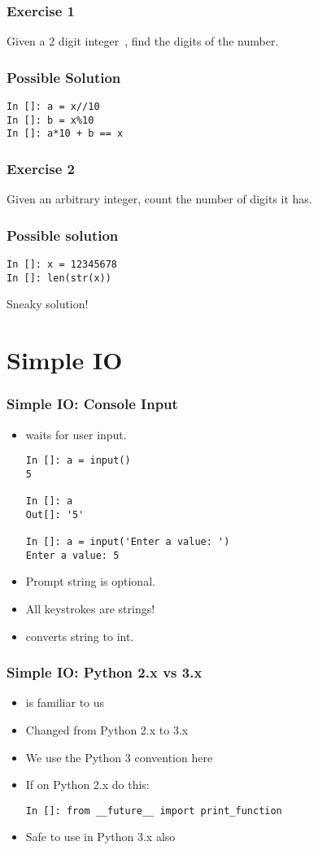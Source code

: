 \documentclass[14pt,compress]{beamer}
\begin{document}
\begin{frame}
  \frametitle{Exercise 1}
  Given a 2 digit integer\ , find the digits of the number.
\end{frame}

\begin{frame}[fragile]
  \frametitle{Possible Solution}
\begin{lstlisting}
In []: a = x//10
In []: b = x%10
In []: a*10 + b == x
\end{lstlisting}
\end{frame}

\begin{frame}
  \frametitle{Exercise 2}
  Given an arbitrary integer, count the number of digits it has.
\end{frame}

\begin{frame}[fragile]
\frametitle{Possible solution}
\begin{lstlisting}
In []: x = 12345678
In []: len(str(x))
\end{lstlisting}

  Sneaky solution!
\end{frame}



\section{Simple IO}
\begin{frame}[fragile]
  \frametitle{Simple IO: Console Input}
  \small
  \begin{itemize}
    \item {} waits for user input.
      \begin{lstlisting}
In []: a = input()
5

In []: a
Out[]: '5'

In []: a = input('Enter a value: ')
Enter a value: 5
      \end{lstlisting}
    \item Prompt string is optional.
    \item All keystrokes are strings!
    \item {} converts string to int.
  \end{itemize}
\end{frame}

\begin{frame}[fragile]
  \frametitle{Simple IO: Python 2.x vs 3.x}
  \begin{itemize}
  \item {} is familiar to us
  \item Changed from Python 2.x to 3.x
  \item We use the Python 3 convention here
    \vspace*{2em}
  \item If on Python 2.x do this:
  {
    \small
\begin{lstlisting}
In []: from __future__ import print_function
\end{lstlisting}
  }
  \item Safe to use in Python 3.x also
  \end{itemize}
\end{frame}
\end{document}
